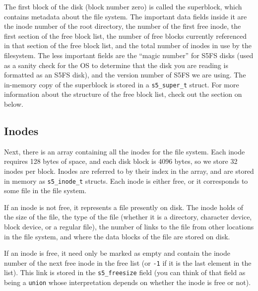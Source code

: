 The first block of the disk (block number zero) is called the superblock, which contains metadata about the file system. The important data fields inside it are the inode number of the root directory, the number of the first free inode, the first section of the free block list, the number of free blocks currently referenced in that section of the free block list, and the total number of inodes in use by the filesystem. The less important fields are the ``magic number'' for S5FS disks (used as a sanity check for the OS to determine that the disk you are reading is formatted as an S5FS disk), and the version number of S5FS we are using. The in-memory copy of the superblock is stored in a \texttt{s5\_super\_t} struct. For more information about the structure of the free block list, check out the section on  below.

\subsection{Inodes}

Next, there is an array containing all the inodes for the file system. Each inode requires 128 bytes of space, and each disk block is 4096 bytes, so we store 32 inodes per block. Inodes are referred to by their index in the array, and are stored in memory as \texttt{s5\_inode\_t} structs.  Each inode is either free, or it corresponds to some file in the file system.

If an inode is not free, it represents a file presently on disk.  The inode holds of the size of the file, the type of the file (whether it is a directory, character device, block device, or a regular file), the number of links to the file from other locations in the file system, and where the data blocks of the file are stored on disk.

If an inode is free, it need only be marked as empty and contain the inode number of the next free inode in the free list (or \texttt{-1} if it is the last element in the list). This link is stored in the \texttt{s5\_freesize} field (you can think of that field as being a \texttt{union} whose interpretation depends on whether the inode is free or not).

